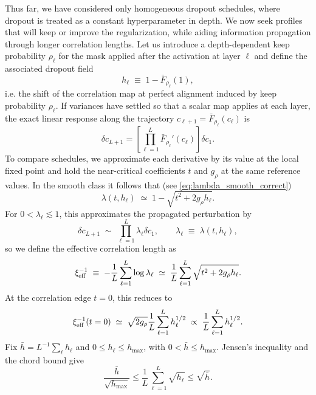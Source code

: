 Thus far, we have considered only homogeneous dropout schedules, where dropout is treated as a constant hyperparameter in depth. We now seek profiles that will keep or improve the regularization, while aiding information propagation through longer correlation lengths. Let us introduce a depth-dependent keep probability $\rho_\ell$ for the mask applied after the activation at layer $\ell$ and define the associated dropout field
\begin{equation}
h_\ell \;\equiv\; 1-\bar F_{\rho_\ell}(1),
\end{equation}
i.e. the shift of the correlation map at perfect alignment induced by keep probability $\rho_\ell$. If variances have settled so that a scalar map applies at each layer, the exact linear response along the trajectory $c_{\ell+1}=\bar F_{\rho_\ell}(c_\ell)$ is
\begin{equation}
\delta c_{L+1}=\left[\prod_{\ell=1}^L \bar F_{\rho_\ell}'(c_\ell)\right]\delta c_1.
\end{equation}
To compare schedules, we approximate each derivative by its value at the local fixed point and hold the near-critical coefficients $t$ and $g_\rho$ at the same reference values. In the smooth class it follows that (see \eqref{eq:lambda_smooth_correct})
\begin{equation}
\lambda(t,h_\ell)\;\simeq\; 1-\sqrt{t^2+2g_\rho h_\ell}.
\end{equation}
For $0<\lambda_\ell\lesssim 1$, this approximates the propagated perturbation by
\begin{equation}
\delta c_{L+1} \;\sim\; \prod_{\ell=1}^L \lambda_\ell \delta c_1, \qquad \lambda_\ell \;\equiv\; \lambda(t,h_\ell),
\label{delta_c_dropout_perturb}
\end{equation}
so we define the effective correlation length as
\begin{equation}
\xi_{\rm eff}^{-1} \;\equiv\; -\frac{1}{L}\sum_{\ell=1}^L \log\lambda_\ell \;\simeq\; \frac{1}{L}\sum_{\ell=1}^L \sqrt{t^2+2g_\rho h_\ell}.
\end{equation}
At the correlation edge $t=0$, this reduces to
\begin{equation}
\xi_{\rm eff}^{-1}(t=0) \;\simeq\; \sqrt{2g_\rho} \frac{1}{L}\sum_{\ell=1}^L h_\ell^{1/2} \;\propto\; \frac{1}{L}\sum_{\ell=1}^L h_\ell^{1/2}.
\label{eff_corr}
\end{equation}
Fix $\bar h=L^{-1}\sum_\ell h_\ell$ and $0\le h_\ell\le h_{\max}$, with $0<\bar h\le h_{\max}$. Jensen's inequality and the chord bound give
\begin{equation}
\frac{\bar h}{\sqrt{h_{\max}}}
\le \frac1L\sum_{\ell=1}^L\sqrt{h_\ell}
\le \sqrt{\bar h}.
\end{equation}
